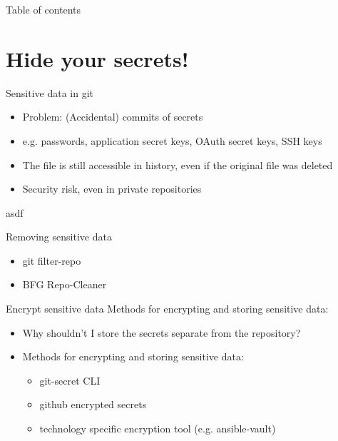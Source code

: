 \documentclass[compress,aspectratio=169]{beamer}
\begin{document}
	\begin{frame}[plain]
		\titlepage
	\end{frame}

	\begin{frame}[t]{Table of contents}
		\tableofcontents[subsectionstyle=hide/hide]
	\end{frame}


	\section{Hide your secrets!}

		\begin{frame}{Sensitive data in git}
			\begin{itemize}
				\item Problem: (Accidental) commits of secrets
				\item e.g. passwords, application secret keys, OAuth secret keys, SSH keys
				\item The file is still accessible in history, even if the original file was deleted
				\item Security risk, even in private repositories
			\end{itemize}	
		 asdf \cite{github2023removing}
		\end{frame}

		\begin{frame}{Removing sensitive data}
			\begin{itemize}
				\item git filter-repo
				\item BFG Repo-Cleaner
			\end{itemize}
		\end{frame}
		
		\begin{frame}{Encrypt sensitive data}
			Methods for encrypting and storing sensitive data:
			\begin{itemize}
				\item 	Why shouldn't I store the secrets separate from the repository?
				\item 	Methods for encrypting and storing sensitive data:
						\begin{itemize}
							\item git-secret CLI 
							\item github encrypted secrets
							\item technology specific encryption tool (e.g. ansible-vault)
						\end{itemize}
			\end{itemize}
		\end{frame}
\end{document}
